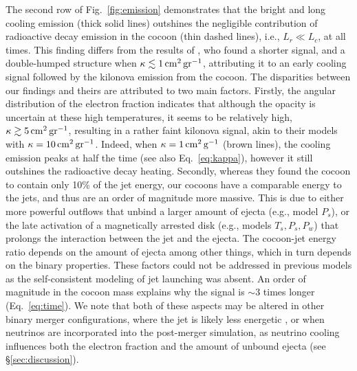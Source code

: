 \documentclass[twocolumn,dvipsnames]{aastex62}
\begin{document}
The second row of Fig.~\ref{fig:emission} demonstrates that the bright and long cooling emission (thick solid lines) outshines the negligible contribution of radioactive decay emission in the cocoon (thin dashed lines), i.e., $ L_r \ll L_c $, at all times. This finding differs from the results of \citet{Gottlieb2018a,Gottlieb2020c}, who found a shorter signal, and a double-humped structure when $ \kappa \lesssim 1\,{\rm cm^2\,gr^{-1}} $, attributing it to an early cooling signal followed by the kilonova emission from the cocoon. The disparities between our findings and theirs are attributed to two main factors. Firstly, the angular distribution of the electron fraction indicates that although the opacity is uncertain at these high temperatures, it seems to be relatively high, $ \kappa \gtrsim 5\,{\rm cm^2\,gr^{-1}} $, resulting in a rather faint kilonova signal, akin to their models with $ \kappa = 10\,{\rm cm^2\,gr^{-1}} $. Indeed, when $ \kappa = 1\,{\rm cm^2\,g^{-1}} $ (brown lines), the cooling emission peaks at half the time (see also Eq.~\eqref{eq:kappa}), however it still outshines the radioactive decay heating. Secondly, whereas they found the cocoon to contain only 10\% of the jet energy, our cocoons have a comparable energy to the jets, and thus are an order of magnitude more massive. This is due to either more powerful outflows that unbind a larger amount of ejecta (e.g., model $ P_s $), or the late activation of a magnetically arrested disk (e.g., models $ T_s, P_s, P_w $) that prolongs the interaction between the jet and the ejecta. The cocoon-jet energy ratio depends on the amount of ejecta among other things, which in turn depends on the binary properties. These factors could not be addressed in previous models as the self-consistent modeling of jet launching was absent. An order of magnitude in the cocoon mass explains why the signal is $ \sim 3 $ times longer (Eq.~\eqref{eq:time}). We note that both of these aspects may be altered in other binary merger configurations, where the jet is likely less energetic \citep[see][]{Gottlieb2023}, or when neutrinos are incorporated into the post-merger simulation, as neutrino cooling influences both the electron fraction and the amount of unbound ejecta (see \S\ref{sec:discussion}).
\end{document}

